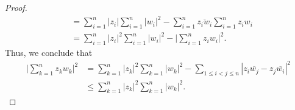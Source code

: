 \documentclass[a4paper]{article}
\begin{document}
\begin{enumerate}
\begin{proof}
\begin{align*}
                                                                                                                &=  \sum_{ i=1  }^{ n  }| {z}_{i} | \sum_{ i=1  }^{ n   } | {w}_{i} |^{2} - \sum_{ i=1  }^{ n }  \overline{{z}_{i} {w}_{i}} \sum_{ i=1  }^{ n } {z}_{i} {w}_{i} \tag{for \( i = j  \)} \\  
                                                                                                                &=  \sum_{ i=1  }^{ n } | {z}_{i} |^{2} \sum_{ i=1  }^{ n  } | {w}_{i} |^{2} - \Big| \sum_{ i=1  }^{ n } {z}_{i} {w}_{i}  \Big|^{2}.
        \end{align*}
        Thus, we conclude that 
        \begin{align*}   \Big| \sum_{ k=1  }^{ n } {z}_{k} {w}_{k} \Big|^{2} &= \sum_{ k=1  }^{ n } | {z}_{k} |^{2} \sum_{ k=1  }^{ n } | {w}_{k } |^{2} - \sum_{ 1 \leq i < j \leq n  }^{  } | {z}_{i} \overline{{w}_{j}} - {z}_{j} \overline{{w}_{i}} |^{2} \\  
            &\leq \sum_{ k=1  }^{ n } | {z}_{k } |^{2} \sum_{ k=1  }^{ n } | {w}_{k } |^{2}.  
        \end{align*}


\end{proof}
\end{enumerate}
\end{document}
